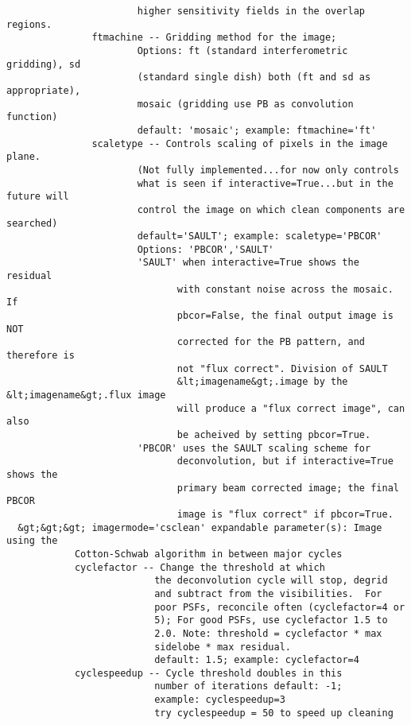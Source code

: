 \begin{verbatim}
                       higher sensitivity fields in the overlap regions.
               ftmachine -- Gridding method for the image;
                       Options: ft (standard interferometric gridding), sd
                       (standard single dish) both (ft and sd as appropriate),
                       mosaic (gridding use PB as convolution function)
                       default: 'mosaic'; example: ftmachine='ft'
               scaletype -- Controls scaling of pixels in the image plane.
                       (Not fully implemented...for now only controls 
                       what is seen if interactive=True...but in the future will 
                       control the image on which clean components are searched)
                       default='SAULT'; example: scaletype='PBCOR'
                       Options: 'PBCOR','SAULT'
                       'SAULT' when interactive=True shows the residual
                              with constant noise across the mosaic. If
                              pbcor=False, the final output image is NOT
                              corrected for the PB pattern, and therefore is
                              not "flux correct". Division of SAULT
                              &lt;imagename&gt;.image by the &lt;imagename&gt;.flux image
                              will produce a "flux correct image", can also
                              be acheived by setting pbcor=True.
                       'PBCOR' uses the SAULT scaling scheme for
                              deconvolution, but if interactive=True shows the
                              primary beam corrected image; the final PBCOR
                              image is "flux correct" if pbcor=True.
  &gt;&gt;&gt; imagermode='csclean' expandable parameter(s): Image using the
            Cotton-Schwab algorithm in between major cycles
            cyclefactor -- Change the threshold at which
                          the deconvolution cycle will stop, degrid
                          and subtract from the visibilities.  For
                          poor PSFs, reconcile often (cyclefactor=4 or
                          5); For good PSFs, use cyclefactor 1.5 to
                          2.0. Note: threshold = cyclefactor * max
                          sidelobe * max residual.
                          default: 1.5; example: cyclefactor=4
            cyclespeedup -- Cycle threshold doubles in this
                          number of iterations default: -1;
                          example: cyclespeedup=3
                          try cyclespeedup = 50 to speed up cleaning 

\end{verbatim}
